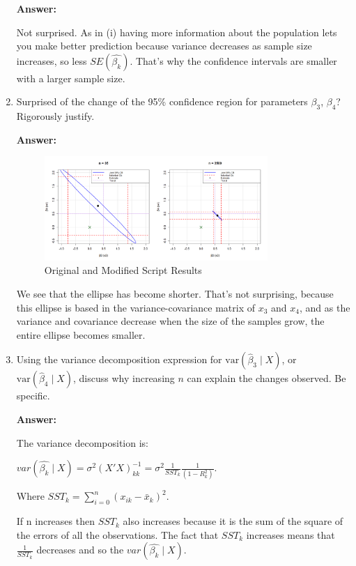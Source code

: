 \documentclass[12pt,a4paper]{article}
\begin{document}
\begin{enumerate}[label=(\roman*)]
  \textbf{Answer:}

  Not surprised. As in (i) having more information about the population lets you make better prediction because variance decreases as sample size increases, so less $SE(\hat{\beta_k})$. That's why the confidence intervals are smaller with a larger sample size.
  
  
  \item Surprised of the change of the 95\% confidence region for parameters $\beta_3$, $\beta_4$? Rigorously justify.
  
  \textbf{Answer:} 

    \begin{figure}[H]  
      \centering
      \includegraphics[width=0.8\textwidth]{Files/elipse_comparison.png}
      \caption{Original and Modified Script Results}
      \label{fig:ellipse}
    \end{figure}

  We see that the ellipse has become shorter. That's not surprising, because this ellipse is based in the variance-covariance matrix of $x_3$ and $x_4$, and as the variance and covariance decrease when the size of the samples grow, the entire ellipse becomes smaller. 
  
  \item Using the variance decomposition expression for $\text{var}(\hat{\beta}_3 \mid X)$, or $\text{var}(\hat{\beta}_4 \mid X)$, discuss why increasing $n$ can explain the changes observed. Be specific.
  
  \textbf{Answer:} 

The variance decomposition is:
\begin{center}
    
$var(\hat{\beta_k}\mid X) = \sigma^2(X'X)^{-1}_{kk}= \sigma^2 \frac{1}{SST_k} \frac{1}{(1-R_k^2)}$.
\end{center}

Where $SST_k = \sum^n_{i=0}(x_{ik}-\bar{x}_k)^2$. 

If n increases then $SST_k$ also increases because it is the sum of the square of the errors of all the observations. The fact that $SST_k$ increases means that $\frac{1}{SST_k}$ decreases and so the $var(\hat{\beta_k}\mid X)$. 


\end{enumerate}
\end{document}
